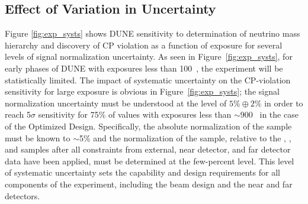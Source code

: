 \subsection{Effect of Variation in Uncertainty}
\label{sec:syst_var}
Figure \ref{fig:exp_systs} shows DUNE sensitivity to determination of
neutrino mass hierarchy and discovery of CP violation
as a function of exposure for several levels of signal normalization uncertainty.
As seen in Figure~\ref{fig:exp_systs}, for early phases of DUNE
with exposures less than \num{100}~\ktMWyr, the experiment
will be statistically limited.
The impact of systematic uncertainty on the CP-violation sensitivity for large exposure
is obvious in Figure~\ref{fig:exp_systs}; the \nue signal normalization uncertainty must
be understood at the level of $5\% \oplus 2\%$ in order to reach 5$\sigma$ sensitivity for
75\% of \deltacp values with exposures less than $\sim$\num{900}~\ktMWyr{} in the case of the
Optimized Design. Specifically, the absolute normalization of the \numu sample must be known to
$\sim$5\% and the normalization of the \nue sample,
relative to the \anue, \numu, and \anumu samples after all constraints from
external, near detector, and far detector data have been applied, must be determined 
at the few-percent level. This level of systematic uncertainty sets the capability and
design requirements for all components of the experiment, including the beam design and the
near and far detectors.
%
